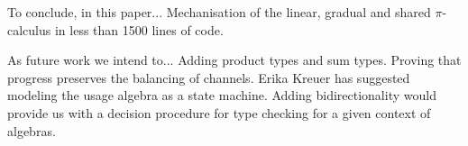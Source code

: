 \documentclass[a4paper,UKenglish,cleveref,autoref,thm-restate,authorcolumns]{lipics-v2019}
\theoremstyle{definition}
\newcommand{\picalc}{$\pi$-calculus}
\begin{document}
\cite{Rouvoet2020}

To conclude, in this paper...
Mechanisation of the linear, gradual and shared \picalc{} in less than 1500 lines of code.

As future work we intend to...
Adding product types and sum types.
Proving that progress preserves the balancing of channels.
Erika Kreuer has suggested modeling the usage algebra as a state machine.
Adding bidirectionality would provide us with a decision procedure for type checking for a given context of algebras.

\newpage


\newpage
\appendix

\end{document}
